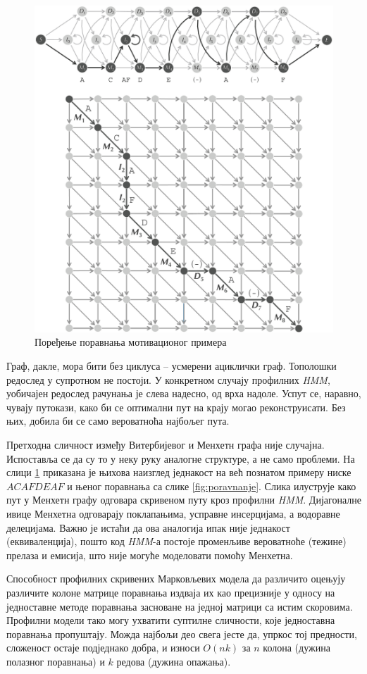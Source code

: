 \documentclass[12pt,oneside]{memoir}
\begin{document}
\begin{CJK}{UTF8}{ipxm}
\begin{figure}[H]
  \centering
  \includegraphics[width=.85\textwidth]{poravnanje2.png}
  \caption{Поређење поравнања мотивационог примера\cite{compeau2015}}
  \label{fig:poravnanje2}
\end{figure}

Граф, дакле, мора бити без циклуса -- усмерени ациклички граф. Тополошки редослед у супротном не постоји. У конкретном случају профилних \textit{HMM}, уобичајен редослед рачунања је слева надесно, од врха надоле. Успут се, наравно, чувају путокази, како би се оптимални пут на крају могао реконструисати. Без њих, добила би се само вероватноћа најбољег пута.

Претходна сличност између Витербијевог и Менхетн графа није случајна. Испоставља се да су то у неку руку аналогне структуре, а не само проблеми. На слици \ref{fig:poravnanje2} приказана је њихова наизглед једнакост на већ познатом примеру ниске $ACAFDEAF$ и њеног поравнања са слике \ref{fig:poravnanje}. Слика илуструје како пут у Менхетн графу одговара скривеном путу кроз профилни \textit{HMM}. Дијагоналне ивице Менхетна одговарају поклапањима, усправне инсерцијама, а водоравне делецијама. Важно је истаћи да ова аналогија ипак није једнакост (еквиваленција), пошто код \textit{HMM}-а постоје променљиве вероватноће (тежине) прелаза и емисија, што није могуће моделовати помоћу Менхетна.

Способност профилних скривених Марковљевих модела да различито оцењују различите колоне матрице поравнања издваја их као прецизније у односу на једноставне методе поравнања засноване на једној матрици са истим скоровима. Профилни модели тако могу ухватити суптилне сличности, које једноставна поравнања пропуштају. Можда најбољи део свега јесте да, упркос тој предности, сложеност остаје подједнако добра, и износи $O(nk)$ за $n$ колона (дужина полазног поравнања) и $k$ редова (дужина опажања).


\end{CJK}
\end{document}
